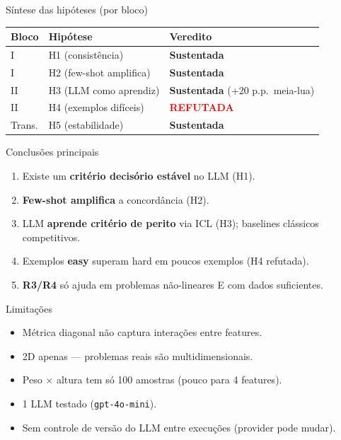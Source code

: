 \documentclass[aspectratio=169,10pt]{beamer}
\begin{document}
\begin{frame}{S\'intese das hip\'oteses (por bloco)}
  \footnotesize
  \begin{center}
  \begin{tabular}{llp{5cm}}
    \toprule
    Bloco & Hip\'otese & Veredito \\
    \midrule
    I  & H1 (consist\^encia)            & \textbf{Sustentada} \\
    I  & H2 (few-shot amplifica)        & \textbf{Sustentada} \\
    II & H3 (LLM como aprendiz)         & \textbf{Sustentada} (+20 p.p.\ meia-lua) \\
    II & H4 (exemplos dif\'iceis)        & \textcolor{red}{\textbf{REFUTADA}} \\
    Trans. & H5 (estabilidade)         & \textbf{Sustentada} \\
    \bottomrule
  \end{tabular}
  \end{center}
\end{frame}

\begin{frame}{Conclus\~oes principais}
  \footnotesize
  \begin{enumerate}
    \item Existe um \textbf{crit\'erio decis\'orio est\'avel} no LLM (H1).
    \item \textbf{Few-shot amplifica} a concord\^ancia (H2).
    \item LLM \textbf{aprende crit\'erio de perito} via ICL (H3); baselines cl\'assicos competitivos.
    \item Exemplos \textbf{easy} superam hard em poucos exemplos (H4 refutada).
    \item \textbf{R3/R4} s\'o ajuda em problemas n\~ao-lineares E com dados suficientes.
  \end{enumerate}
\end{frame}

\begin{frame}{Limita\c{c}\~oes}
  \footnotesize
  \begin{itemize}
    \item M\'etrica diagonal n\~ao captura intera\c{c}\~oes entre features.
    \item 2D apenas --- problemas reais s\~ao multidimensionais.
    \item Peso $\times$ altura tem s\'o 100 amostras (pouco para 4 features).
    \item 1 LLM testado (\texttt{gpt-4o-mini}).
    \item Sem controle de vers\~ao do LLM entre execu\c{c}\~oes (provider pode mudar).
  \end{itemize}
\end{frame}
\end{document}
